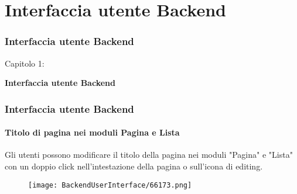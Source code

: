 %

\section{Interfaccia utente Backend}
\begin{frame}[fragile]
	\frametitle{Interfaccia utente Backend}

	\begin{center}\huge{Capitolo 1:}\end{center}
	\begin{center}\huge{\color{typo3darkgrey}\textbf{Interfaccia utente Backend}}\end{center}

\end{frame}

\begin{frame}[fragile]
	\frametitle{Interfaccia utente Backend}
	\framesubtitle{Titolo di pagina nei moduli Pagina e Lista}

	Gli utenti possono modificare il titolo della pagina nei moduli "Pagina" e "Lista" con un doppio click nell'intestazione
	della pagina o sull'icona di editing.

	\begin{figure}
		\texttt{[image: BackendUserInterface/66173.png]}
	\end{figure}

\end{frame}

